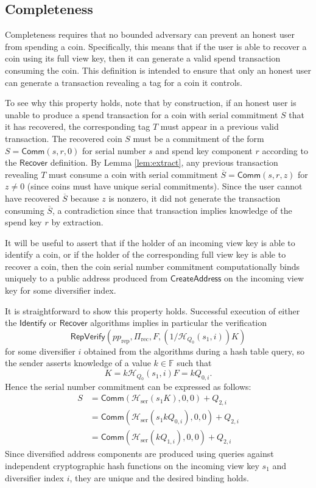 \documentclass{llncs}
\newcommand{\F}{\mathbb{F}}
\newcommand{\hash}{\mathcal{H}}
\newcommand{\func}[1]{\mathsf{#1}}
\newcommand{\comm}{\func{Comm}}
\begin{document}
\subsection{Completeness}

Completeness requires that no bounded adversary can prevent an honest user from spending a coin.
Specifically, this means that if the user is able to recover a coin using its full view key, then it can generate a valid spend transaction consuming the coin.
This definition is intended to ensure that only an honest user can generate a transaction revealing a tag for a coin it controls.

To see why this property holds, note that by construction, if an honest user is unable to produce a spend transaction for a coin with serial commitment $S$ that it has recovered, the corresponding tag $T$ must appear in a previous valid transaction.
The recovered coin $S$ must be a commitment of the form $S = \comm(s,r,0)$ for serial number $s$ and spend key component $r$ according to the $\func{Recover}$ definition.
By Lemma \ref{lem:extract}, any previous transaction revealing $T$ must consume a coin with serial commitment $\overline{S} = \comm(s,r,z)$ for $z \neq 0$ (since coins must have unique serial commitments).
Since the user cannot have recovered $\overline{S}$ because $z$ is nonzero, it did not generate the transaction consuming $\overline{S}$, a contradiction since that transaction implies knowledge of the spend key $r$ by extraction.

\begin{remark}
It will be useful to assert that if the holder of an incoming view key is able to identify a coin, or if the holder of the corresponding full view key is able to recover a coin, then the coin serial number commitment computationally binds uniquely to a public address produced from $\func{CreateAddress}$ on the incoming view key for some diversifier index.

It is straightforward to show this property holds.
Successful execution of either the $\func{Identify}$ or $\func{Recover}$ algorithms implies in particular the verification $$\func{RepVerify}(pp_{\text{rep}},\Pi_{\text{rec}},F,(1/\hash_{Q_0}(s_1,i))K)$$ for some diversifier $i$ obtained from the algorithms during a hash table query, so the sender asserts knowledge of a value $k \in \F$ such that $$K = k\hash_{Q_0}(s_1,i)F = kQ_{0,i}.$$
Hence the serial number commitment can be expressed as follows:
\begin{align*}
S &= \comm(\hash_{\text{ser}}(s_1 K), 0, 0) + Q_{2,i} \\
&= \comm(\hash_{\text{ser}}(s_1 kQ_{0,i}), 0, 0) + Q_{2,i} \\
&= \comm(\hash_{\text{ser}}(kQ_{1,i}), 0, 0) + Q_{2,i}
\end{align*}
Since diversified address components are produced using queries against independent cryptographic hash functions on the incoming view key $s_1$ and diversifier index $i$, they are unique and the desired binding holds.
\end{remark}
\end{document}
